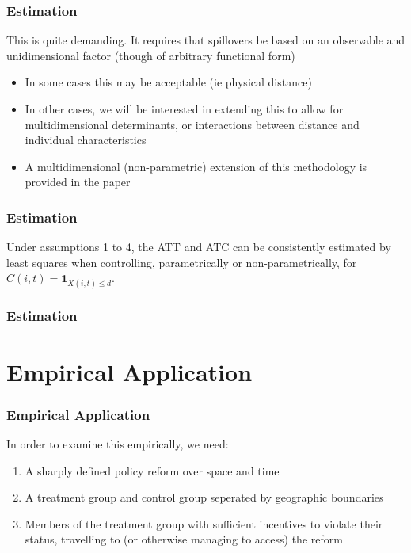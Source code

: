 \documentclass[10pt,letterpaper,subeqn]{beamer}
\begin{document}
\begin{frame}[label=estim8]
  \frametitle{Estimation}
This is quite demanding.  It requires that spillovers be based on an observable 
and unidimensional factor (though of arbitrary functional form)
\vspace{4mm}
\begin{itemize}
\item In some cases this may be acceptable (ie physical distance)
\item In other cases, we will be interested in extending this to allow for 
multidimensional determinants, or interactions between distance and individual
characteristics
\item A multidimensional (non-parametric) extension of this methodology is 
provided in the paper
\end{itemize}
\end{frame}

\begin{frame}[label=estim8]
  \frametitle{Estimation}
\begin{tcolorbox}[title =Proposition 1]
Under assumptions 1 to 4, the ATT and ATC can be 
consistently estimated by least squares when controlling, parametrically or
non-parametrically, for $C(i,t)=\mathbf{1}_{X(i,t)\leq d}$.
\end{tcolorbox}
\end{frame}

\begin{frame}[label=estim9]
  \frametitle{Estimation}
\end{frame}

\section{Empirical Application}
\begin{frame}[label=empir1]
  \frametitle{Empirical Application}
In order to examine this empirically, we need:
\vspace{4mm}
\begin{enumerate}
\item A sharply defined policy reform over space and time
\item A treatment group and control group seperated by geographic boundaries
\item Members of the treatment group with sufficient incentives to violate their
status, travelling to (or otherwise managing to access) the reform
\end{enumerate}
\end{frame}
\end{document}
